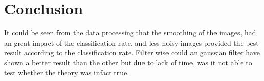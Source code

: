 \chapter{Conclusion}
It could be seen from the data processing
that the smoothing of the images,
had an great impact of the classification rate,
and  less noisy images provided the best result according to the classification rate.
Filter wise could an gaussian filter have shown a better result than the other
but due to lack of time, was it not able to test whether the theory was infact true. 